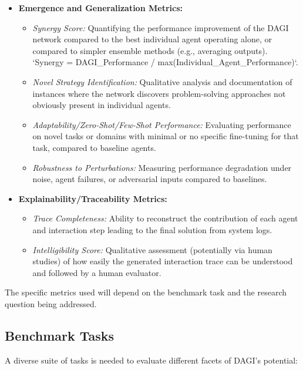 \documentclass[12pt]{amsart}
\begin{document}
\begin{itemize}[leftmargin=*]
    \item \textbf{Emergence and Generalization Metrics:}
        \begin{itemize}
            \item \textit{Synergy Score:} Quantifying the performance improvement of the DAGI network compared to the best individual agent operating alone, or compared to simpler ensemble methods (e.g., averaging outputs). `Synergy = DAGI_Performance / max(Individual_Agent_Performance)`.
            \item \textit{Novel Strategy Identification:} Qualitative analysis and documentation of instances where the network discovers problem-solving approaches not obviously present in individual agents.
            \item \textit{Adaptability/Zero-Shot/Few-Shot Performance:} Evaluating performance on novel tasks or domains with minimal or no specific fine-tuning for that task, compared to baseline agents.
            \item \textit{Robustness to Perturbations:} Measuring performance degradation under noise, agent failures, or adversarial inputs compared to baselines.
        \end{itemize}

    \item \textbf{Explainability/Traceability Metrics:}
        \begin{itemize}
            \item \textit{Trace Completeness:} Ability to reconstruct the contribution of each agent and interaction step leading to the final solution from system logs.
            \item \textit{Intelligibility Score:} Qualitative assessment (potentially via human studies) of how easily the generated interaction trace can be understood and followed by a human evaluator.
        \end{itemize}
\end{itemize}
The specific metrics used will depend on the benchmark task and the research question being addressed.

\subsection{Benchmark Tasks}
\label{subsec:benchmarks}
A diverse suite of tasks is needed to evaluate different facets of DAGI's potential:
\end{document}
